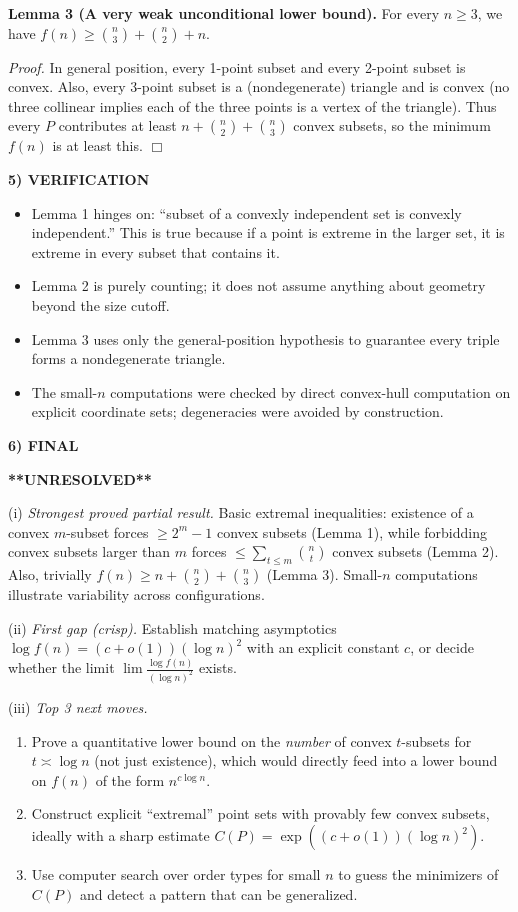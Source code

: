 \medskip
\noindent\textbf{Lemma 3 (A very weak unconditional lower bound).}
For every $n\ge 3$, we have $f(n)\ge \binom{n}{3}+\binom{n}{2}+n$.

\noindent\emph{Proof.}
In general position, every 1-point subset and every 2-point subset is convex.
Also, every 3-point subset is a (nondegenerate) triangle and is convex (no three collinear implies each of the three points is a vertex of the triangle).
Thus every $P$ contributes at least $n+\binom{n}{2}+\binom{n}{3}$ convex subsets, so the minimum $f(n)$ is at least this. \hfill$\Box$

\medskip
\noindent\textbf{5) VERIFICATION}

\begin{itemize}
\item Lemma 1 hinges on: ``subset of a convexly independent set is convexly independent.'' This is true because if a point is extreme in the larger set, it is extreme in every subset that contains it.
\item Lemma 2 is purely counting; it does not assume anything about geometry beyond the size cutoff.
\item Lemma 3 uses only the general-position hypothesis to guarantee every triple forms a nondegenerate triangle.
\item The small-$n$ computations were checked by direct convex-hull computation on explicit coordinate sets; degeneracies were avoided by construction.
\end{itemize}

\medskip
\noindent\textbf{6) FINAL}

\textbf{**UNRESOLVED**}

(i) \emph{Strongest proved partial result.} Basic extremal inequalities: existence of a convex $m$-subset forces $\ge 2^m-1$ convex subsets (Lemma 1), while forbidding convex subsets larger than $m$ forces $\le \sum_{t\le m}\binom{n}{t}$ convex subsets (Lemma 2). Also, trivially $f(n)\ge n+\binom{n}{2}+\binom{n}{3}$ (Lemma 3). Small-$n$ computations illustrate variability across configurations.

(ii) \emph{First gap (crisp).} Establish matching asymptotics $\log f(n) = (c+o(1))(\log n)^2$ with an explicit constant $c$, or decide whether the limit $\lim \frac{\log f(n)}{(\log n)^2}$ exists.

(iii) \emph{Top 3 next moves.}
\begin{enumerate}
\item Prove a quantitative lower bound on the \emph{number} of convex $t$-subsets for $t\asymp \log n$ (not just existence), which would directly feed into a lower bound on $f(n)$ of the form $n^{c\log n}$.
\item Construct explicit ``extremal'' point sets with provably few convex subsets, ideally with a sharp estimate $C(P)=\exp((c+o(1))(\log n)^2)$.
\item Use computer search over order types for small $n$ to guess the minimizers of $C(P)$ and detect a pattern that can be generalized.
\end{enumerate}


